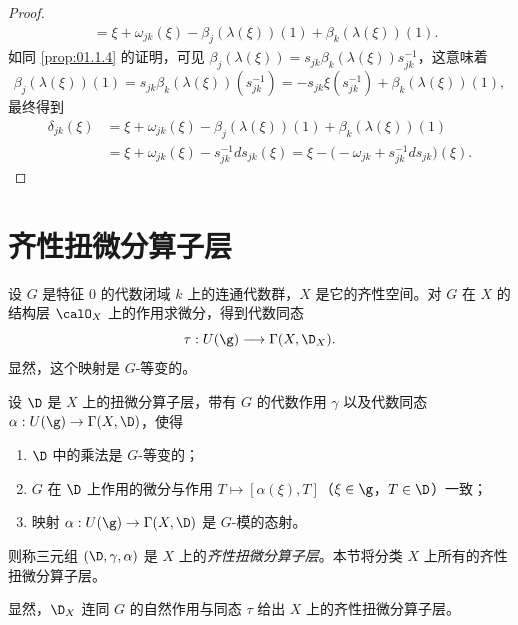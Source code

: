\begin{proof}
\begin{align*}
&=\xi+\omega_{jk}(\xi)-\beta_j(\lambda(\xi))(1)+\beta_k(\lambda(\xi))(1).
\end{align*}
如同 \ref{prop:01.1.4} 的证明，可见 $\beta_j(\lambda(\xi))=s_{jk}\beta_k(\lambda(\xi))s_{jk}^{-1}$，这意味着
$$\beta_j(\lambda(\xi))(1)=s_{jk}\beta_k(\lambda(\xi))(s_{jk}^{-1})=-s_{jk}\xi(s_{jk}^{-1})+\beta_k(\lambda(\xi))(1),$$
最终得到
\begin{align*}
\delta_{jk}(\xi)&=\xi+\omega_{jk}(\xi)-\beta_j(\lambda(\xi))(1)+\beta_k(\lambda(\xi))(1)\\
&=\xi+\omega_{jk}(\xi)-s_{jk}^{-1}ds_{jk}(\xi)=\xi-\bigl(-\omega_{jk}+s_{jk}^{-1}ds_{jk}\bigr)(\xi).
\end{align*}
\end{proof}

\section{齐性扭微分算子层}
\label{sec:01.1.2}

设 $G$ 是特征 $0$ 的代数闭域 $k$ 上的连通代数群，$X$ 是它的齐性空间。对 $G$ 在 $X$ 的结构层 $\calO_X$ 上的作用求微分，得到代数同态
$$\tau:U(\g)\longrightarrow\Gamma(X,\D_X).$$
显然，这个映射是 $G$-等变的。

设 $\D$ 是 $X$ 上的扭微分算子层，带有 $G$ 的代数作用 $\gamma$ 以及代数同态 $\alpha:U(\g)\to\Gamma(X,\D)$，使得

\begin{enumerate}[label=(\roman*)]
  \item $\D$ 中的乘法是 $G$-等变的；
  \item $G$ 在 $\D$ 上作用的微分与作用 $T\mapsto[\alpha(\xi),T]$（$\xi\in\g$，$T\in\D$）一致；
  \item 映射 $\alpha:U(\g)\to\Gamma(X,\D)$ 是 $G$-模的态射。
\end{enumerate}

则称三元组 $(\D,\gamma,\alpha)$ 是 $X$ 上的\emph{齐性扭微分算子层}。本节将分类 $X$ 上所有的齐性扭微分算子层。

显然，$\D_X$ 连同 $G$ 的自然作用与同态 $\tau$ 给出 $X$ 上的齐性扭微分算子层。

